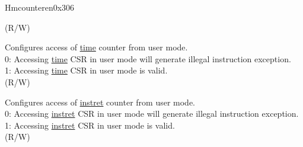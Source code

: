 \begin{register}{H}{mcounteren}{0x306}
\begin{regdesc}
\begin{reglist}
(R/W)
\label{fielddesc:MCOUNTEREN_TM}\item [TM] Configures access of \hyperref[regdesc:TIME]{time} counter from user mode. \\
0: Accessing \hyperref[regdesc:TIME]{time} CSR in user mode will generate illegal instruction exception. \\
1: Accessing \hyperref[regdesc:TIME]{time} CSR in user mode is valid. \\
(R/W)  \\
\label{fielddesc:MCOUNTEREN_IR}\item [IR] Configures access of \hyperref[regdesc:INSTRET]{instret} counter from user mode. \\
0: Accessing \hyperref[regdesc:INSTRET]{instret} CSR in user mode will generate illegal instruction exception. \\
1: Accessing \hyperref[regdesc:INSTRET]{instret} CSR in user mode is valid. \\
(R/W)
\end{reglist}\end{regdesc}
\end{register}

